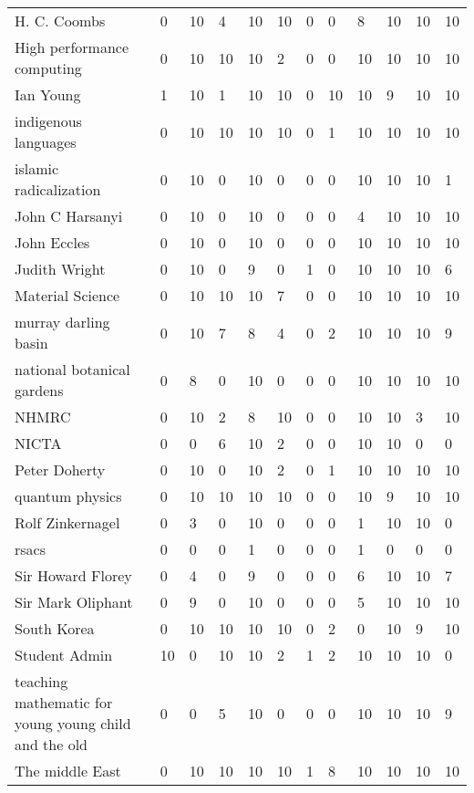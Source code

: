 \documentclass[5pt]{article}
\begin{document}
\begin{table}
\begin{tabular*}{0.5\textwidth}{|p{5cm}|l|l|l|l|l|l|l|l|l|l|l|}
\cline{1-12}
H. C. Coombs &0 &10 &4 &10 &10 &0 &0 &8 &10 &10 &10\\
\cline{1-12}
High performance computing &0 &10 &10 &10 &2 &0 &0 &10 &10 &10 &10\\
\cline{1-12}
Ian Young &1 &10 &1 &10 &10 &0 &10 &10 &9 &10 &10\\
\cline{1-12}
indigenous languages &0 &10 &10 &10 &10 &0 &1 &10 &10 &10 &10\\
\cline{1-12}
islamic radicalization &0 &10 &0 &10 &0 &0 &0 &10 &10 &10 &1\\
\cline{1-12}
John C Harsanyi &0 &10 &0 &10 &0 &0 &0 &4 &10 &10 &10\\
\cline{1-12}
John Eccles &0 &10 &0 &10 &0 &0 &0 &10 &10 &10 &10\\
\cline{1-12}
Judith Wright &0 &10 &0 &9 &0 &1 &0 &10 &10 &10 &6\\
\cline{1-12}
Material Science &0 &10 &10 &10 &7 &0 &0 &10 &10 &10 &10\\
\cline{1-12}
murray darling basin &0 &10 &7 &8 &4 &0 &2 &10 &10 &10 &9\\
\cline{1-12}
national botanical gardens &0 &8 &0 &10 &0 &0 &0 &10 &10 &10 &10\\
\cline{1-12}
NHMRC &0 &10 &2 &8 &10 &0 &0 &10 &10 &3 &10\\
\cline{1-12}
NICTA &0 &0 &6 &10 &2 &0 &0 &10 &10 &0 &0\\
\cline{1-12}
Peter Doherty &0 &10 &0 &10 &2 &0 &1 &10 &10 &10 &10\\
\cline{1-12}
quantum physics &0 &10 &10 &10 &10 &0 &0 &10 &9 &10 &10\\
\cline{1-12}
Rolf Zinkernagel &0 &3 &0 &10 &0 &0 &0 &1 &10 &10 &0\\
\cline{1-12}
rsacs &0 &0 &0 &1 &0 &0 &0 &1 &0 &0 &0\\
\cline{1-12}
Sir Howard Florey &0 &4 &0 &9 &0 &0 &0 &6 &10 &10 &7\\
\cline{1-12}
Sir Mark Oliphant &0 &9 &0 &10 &0 &0 &0 &5 &10 &10 &10\\
\cline{1-12}
South Korea &0 &10 &10 &10 &10 &0 &2 &0 &10 &9 &10\\
\cline{1-12}
Student Admin &10 &0 &10 &10 &2 &1 &2 &10 &10 &10 &0\\
\cline{1-12}
teaching mathematic for young young child and the old &0 &0 &5 &10 &0 &0 &0 &10 &10 &10 &9\\
\cline{1-12}
The middle East &0 &10 &10 &10 &10 &1 &8 &10 &10 &10 &10\\
\cline{1-12}
\end{tabular*}
\end{table}
\end{document}

